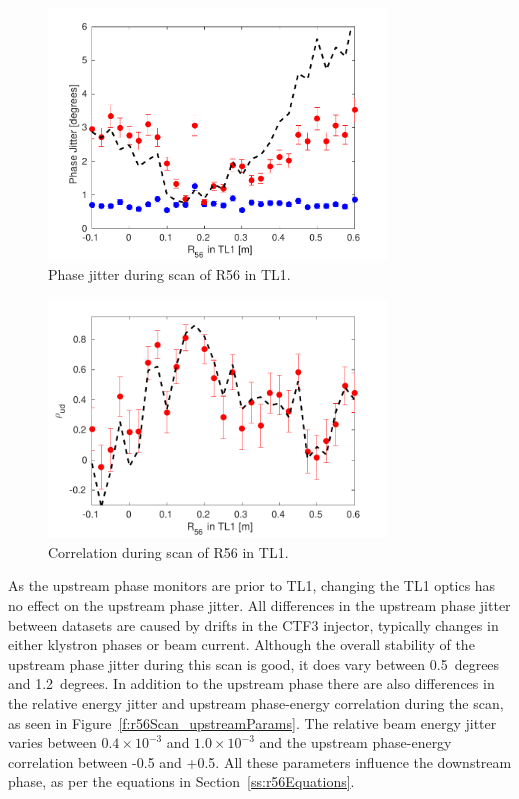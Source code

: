 \begin{figure}
  \centering
  \includegraphics[width=0.8\textwidth]{Figures/propagation/r56Scan_meanPhaseJit}
  \caption{Phase jitter during scan of R56 in TL1.}
  \label{f:r56Scan_meanPhaseJit}
\end{figure}

\begin{figure}
  \centering
  \includegraphics[width=0.8\textwidth]{Figures/propagation/r56Scan_correlation}
  \caption{Correlation during scan of R56 in TL1.}
  \label{f:r56Scan_correlation}
\end{figure}

As the upstream phase monitors are prior to TL1, changing the TL1 optics has no effect on the upstream phase jitter. All differences in the upstream phase jitter between datasets are caused by drifts in the CTF3 injector, typically changes in either klystron phases or beam current. Although the overall stability of the upstream phase jitter during this scan is good, it does vary between 0.5~degrees and 1.2~degrees. In addition to the upstream phase there are also differences in the relative energy jitter and upstream phase-energy correlation during the scan, as seen in Figure~\ref{f:r56Scan_upstreamParams}. The relative beam energy jitter varies between \(0.4\times10^{-3}\) and \(1.0\times10^{-3}\) and the upstream phase-energy correlation between -0.5 and +0.5. All these parameters influence the downstream phase, as per the equations in Section~\ref{ss:r56Equations}.

